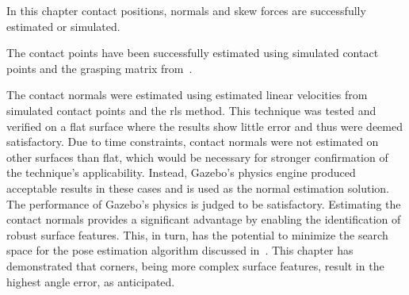 In this chapter contact positions, normals and skew forces are successfully estimated or simulated. \medskip


The contact points have been successfully estimated using simulated contact points and the grasping matrix from~\cite{ruppel-philipp-biotac-gazebo-plugin}. \medskip


The contact normals were estimated using estimated linear velocities from simulated contact points and the \gls{rls} method. This technique was tested and verified on a flat surface where the results show little error and thus were deemed satisfactory. Due to time constraints, contact normals were not estimated on other surfaces than flat, which would be necessary for stronger confirmation of the technique's applicability. Instead, Gazebo's physics engine produced acceptable results in these cases and is used as the normal estimation solution. The performance of Gazebo's physics is judged to be satisfactory. Estimating the contact normals provides a significant advantage by enabling the identification of robust surface features. This, in turn, has the potential to minimize the search space for the pose estimation algorithm discussed in~. This chapter has demonstrated that corners, being more complex surface features, result in the highest angle error, as anticipated.\medskip


